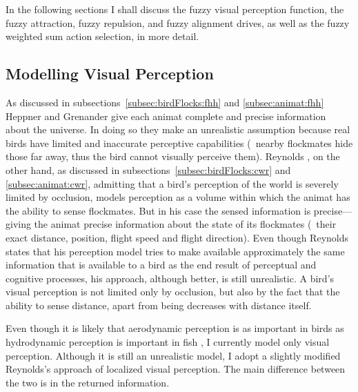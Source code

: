 In the following sections I shall discuss the fuzzy visual perception function, the fuzzy attraction, fuzzy repulsion, and fuzzy alignment drives, as well as the fuzzy weighted sum action selection, in more detail.

\subsection{Modelling Visual Perception}
As discussed in subsections~\ref{subsec:birdFlocks:fhh} and \ref{subsec:animat:fhh} Heppner and Grenander \cite{heppner:1990} give each animat complete and precise information about the universe. In doing so they make an unrealistic assumption because real birds have limited and inaccurate perceptive capabilities (\eg\ nearby flockmates hide those far away, thus the bird cannot visually perceive them). Reynolds \cite{reynolds:1987}, on the other hand, as discussed in subsections~\ref{subsec:birdFlocks:cwr} and \ref{subsec:animat:cwr}, admitting that a bird's perception of the world is severely limited by occlusion, models perception as a volume within which the animat has the ability to sense flockmates. But in his case the sensed information is precise---giving the animat precise information about the state of its flockmates (\ie\ their exact distance, position, flight speed and flight direction). Even though Reynolds \cite{reynolds:1987} states that his perception model tries to make available approximately the same information that is available to a bird as the end result of perceptual and cognitive processes, his approach, although better, is still unrealistic. A bird's visual perception is not limited only by occlusion, but also by the fact that the ability to sense distance, apart from being  decreases with distance itself. 

Even though it is likely that aerodynamic perception is as important in birds as hydrodynamic perception is important in fish \cite{ward:2001}, I currently model only visual perception. Although it is still an unrealistic model, I adopt a slightly modified Reynolds's \cite{reynolds:1999} approach of localized visual perception. The main difference between the two is in the returned information. 

